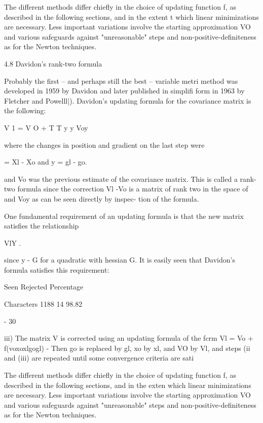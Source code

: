      The different methods differ chiefly in the choice of updating
function f, as described in the following sections, and in the extent t
which linear minimizations are necessary.  Less important variations
involve the starting approximation VO and various safeguards against
"unreasonable" steps and non-positive-definiteness as for the Newton
techniques.
 
 
4.8  Davidon's rank-two formula
 
     Probably the first -- and perhaps still the best -- variable metri
method was developed in 1959 by Davidon and later published in simplifi
form in 1963 by Fletcher and Powelll|).  Davidon's updating formula for
the covariance matrix is the following:
 
 
                         V 1 = V O +  T     T
                             y y Voy
 
 
where the changes in position and gradient on the last step were
 
 
                               = Xl - Xo
and
y = gl - go.
 
and Vo was the previous estimate of the covariance matrix.  This is
called a rank-two formula since the correction Vl -Vo is a matrix of
rank two in the space of  and Voy as can be seen directly by inspec-
tion of the formula.
 
     One fundamental requirement of an updating formula is that the new
matrix satisfies the relationship
 
                           VlY  .
 
 
since y - G for a quadratic with hessian G.  It is easily seen that
Davidon's formula satisfies this requirement:
 
                 Seen Rejected  Percentage
 
Characters       1188       14   98.82
 
                                 - 30
 
 
iii) The matrix V is corrected using an updating formula of the fcrm
                       Vl = Vo + f(voxoxlgogl) -
     Then go is replaced by gl, xo by xl, and VO by Vl, and steps (ii
     and (iii) are repeated until some convergence criteria are sati
 
     The different methods differ chiefly in the choice of updating
function f, as described in the following sections, and in the exten
which linear minimizations are necessary.  Less important variations
involve the starting approximation VO and various safeguards against
"unreasonable" steps and non-positive-definiteness as for the Newton
techniques.
 
